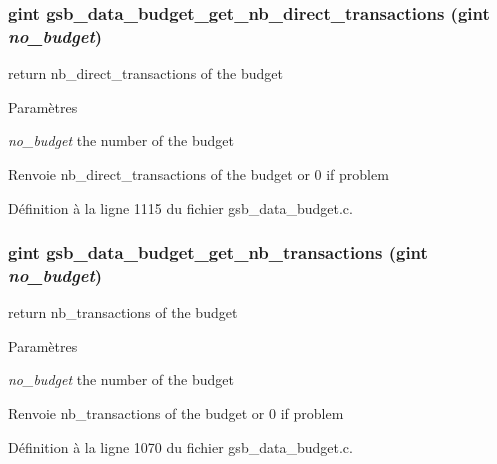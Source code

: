 \subsubsection[{gsb\_\-data\_\-budget\_\-get\_\-nb\_\-direct\_\-transactions}]{\setlength{\rightskip}{0pt plus 5cm}gint gsb\_\-data\_\-budget\_\-get\_\-nb\_\-direct\_\-transactions (gint {\em no\_\-budget})}\label{gsb__data__budget_8c_a1459ccca9cd3a215c837409216667d00}
return nb\_\-direct\_\-transactions of the budget


\begin{DoxyParams}{Paramètres}
\item[{\em no\_\-budget}]the number of the budget\end{DoxyParams}
\begin{DoxyReturn}{Renvoie}
nb\_\-direct\_\-transactions of the budget or 0 if problem 
\end{DoxyReturn}


Définition à la ligne 1115 du fichier gsb\_\-data\_\-budget.c.

\subsubsection[{gsb\_\-data\_\-budget\_\-get\_\-nb\_\-transactions}]{\setlength{\rightskip}{0pt plus 5cm}gint gsb\_\-data\_\-budget\_\-get\_\-nb\_\-transactions (gint {\em no\_\-budget})}\label{gsb__data__budget_8c_ac8284c60c6666fcd5a9cfe61ea69502b}
return nb\_\-transactions of the budget


\begin{DoxyParams}{Paramètres}
\item[{\em no\_\-budget}]the number of the budget\end{DoxyParams}
\begin{DoxyReturn}{Renvoie}
nb\_\-transactions of the budget or 0 if problem 
\end{DoxyReturn}


Définition à la ligne 1070 du fichier gsb\_\-data\_\-budget.c.

